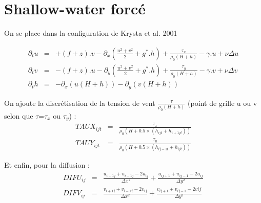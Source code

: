 \documentclass[a4paper,12pt]{article}
\begin{document}
\section{Shallow-water forcé}
On se place dans la configuration de Krysta et al. 2001

\begin{eqnarray}
\partial_tu & = & + (f + z ).v  - \partial_x (\frac{u^2+v^2}{2} + g^*.h) + \frac{\tau_x}{\rho_0(H+h)} - \gamma . u + \nu\Delta u\nonumber \\
\partial_tv & = & - (f + z ).u  - \partial_y (\frac{u^2+v^2}{2} + g^*.h) + \frac{\tau_y}{\rho_0(H+h)} - \gamma . v + \nu\Delta v\nonumber  \label{shal-nonlin-cs}\\
\partial_th & = & - \partial_x(u(H+h)) - \partial_y(v(H+h)) \nonumber
\end{eqnarray}

On ajoute la discrétisation de la tension de vent $\frac{\tau}{\rho_0(H+h)}$ (point de grille u ou v selon que $\tau$=$\tau_x$ ou $\tau_y$) :
\begin{eqnarray*}
TAUX_{ijt} & = & \frac{\tau_x}{\rho_0(H+0.5\times(h_{ijt}+h_{i+1jt}))} \\
TAUY_{ijt} & = & \frac{\tau_y}{\rho_0(H+0.5\times(h_{ij-1t}+h_{ijt}))}
\end{eqnarray*}

Et enfin, pour la diffusion :
\begin{eqnarray*}
DIFU_{ij} & = & \frac{u_{i+1j}+u_{i-1j}-2 u_{ij}}{\Delta x^2} + \frac{u_{ij+1}+u_{ij-1} -2 u_{ij}}{\Delta y^2} \\
DIFV_{ij} & = & \frac{v_{i+1j}+v_{i-1j}- 2 v_{ij}}{\Delta x^2} + \frac{v_{ij+1}+v_{ij-1}-2 v{ij}}{\Delta y^2}  
\end{eqnarray*}
\end{document}
